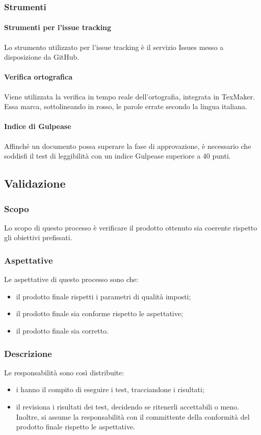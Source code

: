\subsubsection{Strumenti}
\paragraph{Strumenti per l'issue tracking}
Lo strumento utilizzato per l'issue tracking è il servizio Issues messo a disposizione da GitHub.
\paragraph{Verifica ortografica}
Viene utilizzata la verifica in tempo reale dell'ortografia, integrata in TexMaker. Essa marca,
sottolineando in rosso, le parole errate secondo la lingua italiana.
\paragraph{Indice di Gulpease}
Affinché un documento possa superare la fase di approvazione, è necessario che soddisfi il test di leggibilità con un indice Gulpease superiore a 40 punti.
 \subsection{Validazione}
 \subsubsection{Scopo}
 Lo scopo di questo processo è verificare il prodotto ottenuto sia coerente rispetto gli obiettivi prefissati.
 \subsubsection{Aspettative}
 Le aspettative di questo processo sono che:
 \begin{itemize}
 	\item il prodotto finale rispetti i parametri di qualità imposti;
 	\item il prodotto finale sia conforme rispetto le aspettative;
 	\item il prodotto finale sia corretto.
 \end{itemize}
 \subsubsection{Descrizione}
 Le responsabilità sono così distribuite:
 \begin{itemize}
 	\item i \VERP{} hanno il compito di eseguire i test, tracciandone i risultati;
 	\item il \RESP{} revisiona i risultati dei test, decidendo se ritenerli accettabili o meno. Inoltre, si assume la responsabilità con il committente della conformità del prodotto finale rispetto le aspettative.
 \end{itemize}
